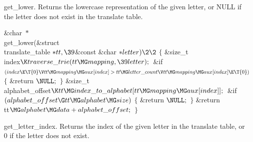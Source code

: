get\_lower.
Returns the lowercase representation of the given letter, or NULL if the letter
does not exist in the translate table.

\Y\B\1\1\&{char} ${}{*}{}$\\{get\_lower}(\&{struct} \\{translate\_table} ${}{*}%
\\{tt},\39{}$\&{const} \&{char} ${}{*}\\{letter})\2\2{}$\6
${}\{{}$\1\6
\&{size\_t} \\{index}${}\K\\{traverse\_trie}(\\{tt}\MG\\{mapping},\39%
\\{letter});{}$\7
\&{if} ${}(\\{index}\E\T{0}\V\\{tt}\MG\\{mapping}\MG\\{aux}[\\{index}]>\\{tt}%
\MG\\{letter\_count}\V\\{tt}\MG\\{mapping}\MG\\{aux}[\\{index}]\E\T{0}){}$\5
${}\{{}$\1\6
\&{return} ${}\NULL;{}$\6
\4${}\}{}$\2\7
\&{size\_t} \\{alphabet\_offset}${}\K\\{tt}\MG\\{index\_to\_alphabet}[\\{tt}\MG%
\\{mapping}\MG\\{aux}[\\{index}]];{}$\7
\&{if} ${}(\\{alphabet\_offset}\G\\{tt}\MG\\{alphabet}\MG\\{size}){}$\5
${}\{{}$\1\6
\&{return} ${}\NULL;{}$\6
\4${}\}{}$\2\6
\&{return} \\{tt}${}\MG\\{alphabet}\MG\\{data}+\\{alphabet\_offset};{}$\6
\4${}\}{}$\2\par
\fi

get\_letter\_index.
Returns the index of the given letter in the translate table, or 0 if the
letter
does not exist.

